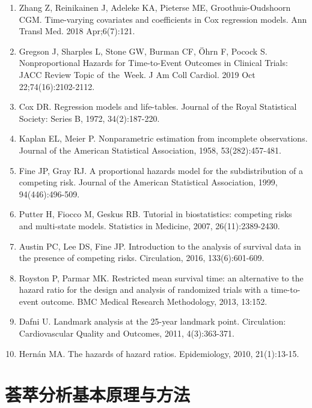\documentclass[
  chinese-hans,
  letterpaper,
  DIV=11,
  numbers=noendperiod]{scrreprt}
\begin{document}
\begin{enumerate}
\def\labelenumi{\arabic{enumi}.}
\item
  Zhang Z, Reinikainen J, Adeleke KA, Pieterse ME, Groothuis-Oudshoorn
  CGM. Time-varying covariates and coefficients in Cox regression
  models. Ann Transl Med. 2018 Apr;6(7):121.
\item
  Gregson J, Sharples L, Stone GW, Burman CF, Öhrn F, Pocock S.
  Nonproportional Hazards for Time-to-Event Outcomes in Clinical Trials:
  JACC Review Topic of~the~Week. J Am Coll Cardiol. 2019 Oct
  22;74(16):2102-2112.
\item
  Cox DR. Regression models and life-tables. Journal of the Royal
  Statistical Society: Series B, 1972, 34(2):187-220.
\item
  Kaplan EL, Meier P. Nonparametric estimation from incomplete
  observations. Journal of the American Statistical Association, 1958,
  53(282):457-481.
\item
  Fine JP, Gray RJ. A proportional hazards model for the subdistribution
  of a competing risk. Journal of the American Statistical Association,
  1999, 94(446):496-509.
\item
  Putter H, Fiocco M, Geskus RB. Tutorial in biostatistics: competing
  risks and multi-state models. Statistics in Medicine, 2007,
  26(11):2389-2430.
\item
  Austin PC, Lee DS, Fine JP. Introduction to the analysis of survival
  data in the presence of competing risks. Circulation, 2016,
  133(6):601-609.
\item
  Royston P, Parmar MK. Restricted mean survival time: an alternative to
  the hazard ratio for the design and analysis of randomized trials with
  a time-to-event outcome. BMC Medical Research Methodology, 2013,
  13:152.
\item
  Dafni U. Landmark analysis at the 25-year landmark point. Circulation:
  Cardiovascular Quality and Outcomes, 2011, 4(3):363-371.
\item
  Hernán MA. The hazards of hazard ratios. Epidemiology, 2010,
  21(1):13-15.
\end{enumerate}


\chapter{荟萃分析基本原理与方法}\label{ux835fux8403ux5206ux6790ux57faux672cux539fux7406ux4e0eux65b9ux6cd5}
\end{document}
